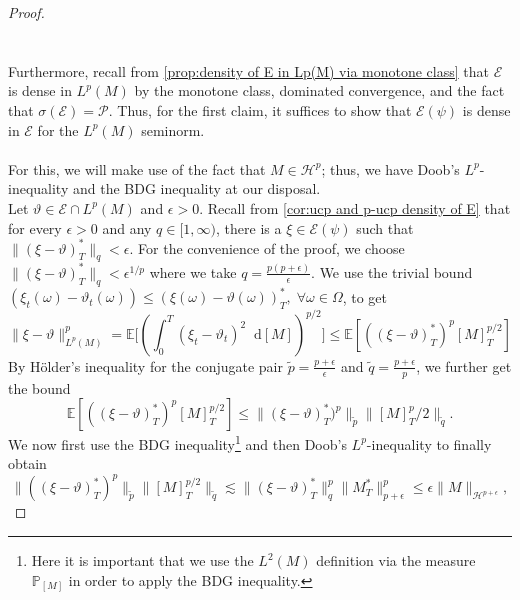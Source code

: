 \documentclass[11pt,a4paper,twoside,openany]{report}
\newcommand{\diff}{\mathop{}\!\mathrm{d}}
\theoremstyle{plain} %
\theoremstyle{definition} %
\theoremstyle{remark} %
\begin{document}
\begin{proof}
\begin{equation*}
 \end{equation*} 
\\\\
    Furthermore, recall from \cref{prop:density of E in Lp(M) via monotone class} that \(\mathcal{E}\) is dense in \(L^p(M)\) by the monotone class, dominated convergence, and the fact that \(\sigma(\mathcal{E})=\mathcal{P}\). Thus, for the first claim, it suffices to show that \(\mathcal{E}(\psi)\) is dense in \(\mathcal{E}\) for the \(L^p(M)\) seminorm. \\\\
 For this, we will make use of the fact that \(M\in\mathcal{H}^p\); thus, we have Doob's \(L^p\)-inequality and the BDG inequality at our disposal.
 \\ Let \(\vartheta\in\mathcal{E}\cap L^p(M)\) and  \(\epsilon>0\).
    Recall from \cref{cor:ucp and p-ucp density of E} that for every \(\epsilon>0\) and any \(q\in[1,\infty)\), there is a \(\xi\in\mathcal{E}(\psi)\) such that \(\lVert (\xi-\vartheta)^*_{T}\rVert_{q}<\epsilon\). For the convenience of the proof, we choose \(\lVert (\xi-\vartheta)^*_{T}\rVert_{q}<\epsilon^{1/p}\) where we take \(q=\frac{p(p+\epsilon)}{\epsilon}\). We use the trivial bound \((\xi_t(\omega)-\vartheta_t(\omega))\leq(\xi(\omega)-\vartheta(\omega))_{T}^*,\;\forall\omega\in\Omega\), to get 
    \begin{equation}
        \rVert \xi-\vartheta\lVert_{L^p(M)}^p=\mathbb{E}\bigg[\left(\int_{0}^{T}(\xi_t-\vartheta_t)^2\diff[M]\right)^{p/2}\bigg]\leq\mathbb{E}[((\xi-\vartheta)_{T}^*)^p[M]_{T}^{p/2}]
    \end{equation}
 By Hölder's inequality for the conjugate pair \(\tilde{p}=\frac{p+\epsilon}{\epsilon}\) and \(\tilde{q}=\frac{p+\epsilon}{p}\), we further get the bound
    \begin{equation}
        \mathbb{E}[((\xi-\vartheta)
        _{T}^*)^p[M]_{T}^{p/2}]\leq\lVert(\xi-\vartheta)_{T}^*)^p\rVert_{\tilde{p}}\lVert[M]_{T}^p/2 \rVert_{\tilde{q}}.
    \end{equation}
    We now first use the BDG inequality\footnote{Here it is important that we use the \(L^2(M)\) definition via the measure \(\mathbb{P}_{[M]}\) in order to apply the BDG inequality.} and then Doob's \(L^p\)-inequality to finally obtain
    \begin{equation}
        \lVert((\xi-\vartheta)_{T}^*)^p\rVert_{\tilde{p}}\lVert[M]_{T}^{p/2} \rVert_{\tilde{q}}\lesssim \lVert(\xi-\vartheta)_{T}^*\rVert_{q}^p\lVert M^*_{T}\rVert_{p+\epsilon}^p\leq\epsilon\lVert M\rVert_{\mathcal{H}^{p+\epsilon}},

\end{equation}
\end{proof}
\end{document}
